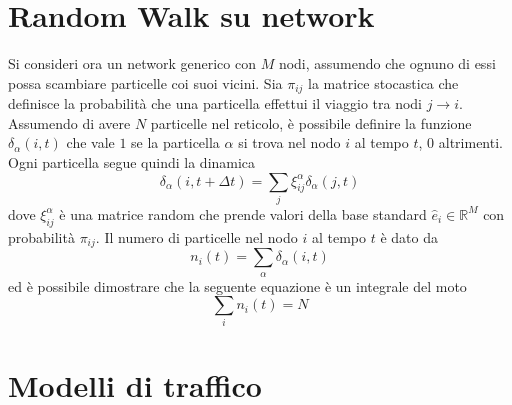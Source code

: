 \documentclass[../main.tex]{subfiles}
\begin{document}
\section*{Random Walk su network}
Si consideri ora un network generico con $M$ nodi, assumendo che ognuno di essi possa scambiare particelle coi suoi vicini.
Sia $\pi_{ij}$ la matrice stocastica che definisce la probabilità che una particella effettui il viaggio tra nodi $j\to i$.
Assumendo di avere $N$ particelle nel reticolo, è possibile definire la funzione $\delta_\alpha(i,t)$ che vale $1$ se la particella $\alpha$ si trova nel nodo $i$ al tempo $t$, 0 altrimenti.
\\Ogni particella segue quindi la dinamica
\begin{equation}
    \delta_\alpha(i,t+\Delta t)=\sum_j\xi_{ij}^\alpha\delta_\alpha(j,t)
\end{equation}
dove $\xi_{ij}^\alpha$ è una matrice random che prende valori della base standard $\widehat{e}_i\in \mathbb{R}^M$ con probabilità $\pi_{ij}$.
Il numero di particelle nel nodo $i$ al tempo $t$ è dato da
\begin{equation}
    n_i(t)=\sum_\alpha\delta_\alpha(i,t)
\end{equation}
ed è possibile dimostrare \cite{RandomWalks} che la seguente equazione è un integrale del moto
\begin{equation}
    \sum_in_i(t)=N
\end{equation}

\section*{Modelli di traffico}
\end{document}

